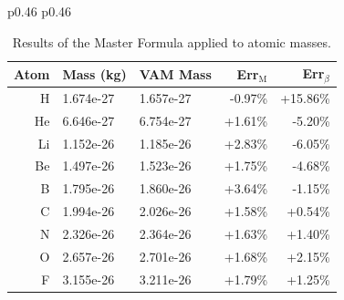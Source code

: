 \documentclass[12pt]{article}
\begin{document}
\begin{table}[htbp]
\scriptsize
\centering
\caption{Results of the Master Formula applied to atomic masses.}
\label{tab:vam_mass_dot_postfix}
\begin{tabular}{p{0.46\linewidth} p{0.46\linewidth}}

\begin{tabular}{|rllrr|}
\toprule
Atom & Mass (kg) & VAM Mass & Err$_\text{M}$ & Err$_\beta$ \\
\midrule
H   & 1.674e-27 & 1.657e-27     & -0.97\% \heartmarker                                                                       & +15.86\% \tikz[baseline=-0.5ex]{\node[draw=none,fill=red,circle,inner sep=3pt]{};}  \\
He  & 6.646e-27 & 6.754e-27     & +1.61\% \tikz[baseline=-0.5ex]{\node[draw=none,fill=green,circle,inner sep=3pt]{};}          & -5.20\% \tikz[baseline=-0.5ex]{\node[draw=none,fill=orange,circle,inner sep=3pt]{};}  \\
Li  & 1.152e-26 & 1.185e-26     & +2.83\% \tikz[baseline=-0.5ex]{\node[draw=none,fill=orange,circle,inner sep=3pt]{};}         & -6.05\% \tikz[baseline=-0.5ex]{\node[draw=none,fill=orange,circle,inner sep=3pt]{};}  \\
Be  & 1.497e-26 & 1.523e-26     & +1.75\% \tikz[baseline=-0.5ex]{\node[draw=none,fill=green,circle,inner sep=3pt]{};}          & -4.68\% \tikz[baseline=-0.5ex]{\node[draw=none,fill=orange,circle,inner sep=3pt]{};}  \\
B   & 1.795e-26 & 1.860e-26     & +3.64\% \tikz[baseline=-0.5ex]{\node[draw=none,fill=orange,circle,inner sep=3pt]{};}         & -1.15\% \tikz[baseline=-0.5ex]{\node[draw=none,fill=green,circle,inner sep=3pt]{};}  \\
C   & 1.994e-26 & 2.026e-26     & +1.58\% \tikz[baseline=-0.5ex]{\node[draw=none,fill=green,circle,inner sep=3pt]{};}          & +0.54\% \heartmarker  \\
N   & 2.326e-26 & 2.364e-26     & +1.63\% \tikz[baseline=-0.5ex]{\node[draw=none,fill=green,circle,inner sep=3pt]{};}          & +1.40\% \tikz[baseline=-0.5ex]{\node[draw=none,fill=green,circle,inner sep=3pt]{};}  \\
O   & 2.657e-26 & 2.701e-26     & +1.68\% \tikz[baseline=-0.5ex]{\node[draw=none,fill=green,circle,inner sep=3pt]{};}          & +2.15\% \tikz[baseline=-0.5ex]{\node[draw=none,fill=green,circle,inner sep=3pt]{};}  \\
F   & 3.155e-26 & 3.211e-26     & +1.79\% \tikz[baseline=-0.5ex]{\node[draw=none,fill=green,circle,inner sep=3pt]{};}          & +1.25\% \tikz[baseline=-0.5ex]{\node[draw=none,fill=green,circle,inner sep=3pt]{};}  \\

\end{tabular}
\end{tabular}
\end{table}
\end{document}

